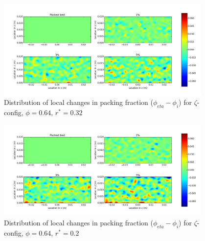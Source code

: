 \begin{figure}[!t]
    \centering
    \includegraphics[width = 0.95\textwidth]{figures/z-62-r23-1-deltas.png}
    \caption{Distribution of local changes in packing fraction ($\phi_{eta} - \phi_i$) for $\zeta$-config, $\phi = 0.64$, $r^* = 0.32$}\label{fig:z-624-r23-deltas}
\end{figure}

\begin{figure}[!t]
    \centering
    \includegraphics[width = 0.95\textwidth]{figures/z-62-r125-1-deltas.png}
    \caption{Distribution of local changes in packing fraction ($\phi_{eta} - \phi_i$) for $\zeta$-config, $\phi = 0.64$, $r^* = 0.2$}\label{fig:z-624-r125-deltas}
\end{figure}


\FloatBarrier


